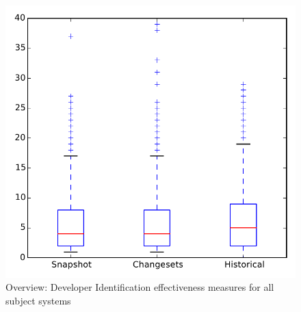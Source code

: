 
\begin{figure}
\centering
\includegraphics[height=0.4\textheight]{figures/dit/all_overview}
\caption{Overview: Developer Identification effectiveness measures for all subject systems}
\label{fig:dit:all:overview}
\end{figure}
